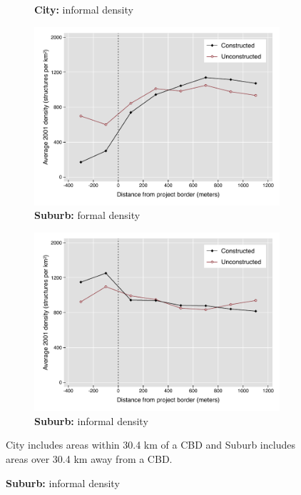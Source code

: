 \documentclass[12pt]{article}
\begin{document}
\begin{figure}[h!]
\begin{subfigure}[b]{0.495\textwidth}
            \caption[]%
            {{\small \textbf{City:} informal density}}    
            \label{fig:preinf_near_het}
        \end{subfigure}
        \begin{subfigure}[b]{0.495\textwidth}
            \centering
            \includegraphics[width=\textwidth,trim={0.3cm .3cm 0.1cm 0cm}, clip=true]{figures/bblu_for_pre_means_het_far.pdf}
            \caption[Network2]%
            {{\small \textbf{Suburb:} formal density}}    
            \label{fig:prefor_far_het}
        \end{subfigure}
        \hfill
        \begin{subfigure}[b]{0.495\textwidth}  
            \centering 
            \includegraphics[width=\textwidth,trim={0.3cm .3cm 0.1cm 0cm}, clip=true]{figures/bblu_inf_pre_means_het_far.pdf}
            \caption[]%
            {{\small \textbf{Suburb:} informal density}}    
            \label{fig:preinf_far_het}
        \end{subfigure}
        \label{fig:rawbblumeans_het}
        \vspace{-6mm}
    {\scriptsize City includes areas within 30.4 km of a CBD and Suburb includes areas over 30.4 km away from a CBD.}
    \end{figure} 
\end{document}
